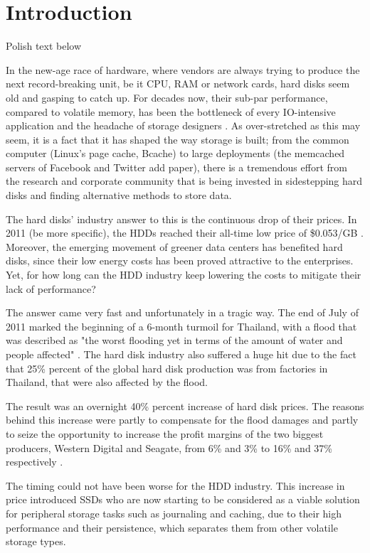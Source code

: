 \chapter{Introduction}\label{ch:intro}

\fixme Polish text below

In the new-age race of hardware, where vendors are always trying to produce the 
next record-breaking unit, be it CPU, RAM or network cards, hard disks seem old 
and gasping to catch up. For decades now, their sub-par performance, compared 
to volatile memory, has been the bottleneck of every IO-intensive application 
and the headache of storage designers \cite{nvm}. As over-stretched as this may 
seem, it is a fact that it has shaped the way storage is built; from the common 
computer (Linux's page cache, Bcache) to large deployments (the memcached 
servers of Facebook and Twitter \fixme add paper), there is a tremendous effort 
from the research and corporate community that is being invested in 
sidestepping hard disks and finding alternative methods to store data.

The hard disks' industry answer to this is the continuous drop of their prices.  
In 2011 (\fixme be more specific), the HDDs reached their all-time low price of 
\$0.053/GB \cite{hdd-price}. Moreover, the emerging movement of greener data 
centers has benefited hard disks, since their low energy costs has been proved 
attractive to the enterprises. Yet, for how long can the HDD industry keep 
lowering the costs to mitigate their lack of performance?

The answer came very fast and unfortunately in a tragic way. The end of July of 
2011 marked the beginning of a 6-month turmoil for Thailand, with a flood that 
was described as "the worst flooding yet in terms of the amount of water and 
people affected" \cite{flood}. The hard disk industry also suffered a huge hit 
due to the fact that 25\% percent of the global hard disk production was from 
factories in Thailand, that were also affected by the flood.

The result was an overnight 40\% percent increase of hard disk prices. The 
reasons behind this increase were partly to compensate for the flood damages 
and partly to seize the opportunity to increase the profit margins of the two 
biggest producers, Western Digital and Seagate, from 6\% and 3\% to 16\% and 
37\% respectively \cite{rosenthal12-unesco}.

The timing could not have been worse for the HDD industry. This increase in 
price introduced SSDs who are now starting to be considered as a viable 
solution for peripheral storage tasks such as journaling and caching, due to 
their high performance and their persistence, which separates them from other 
volatile storage types.

